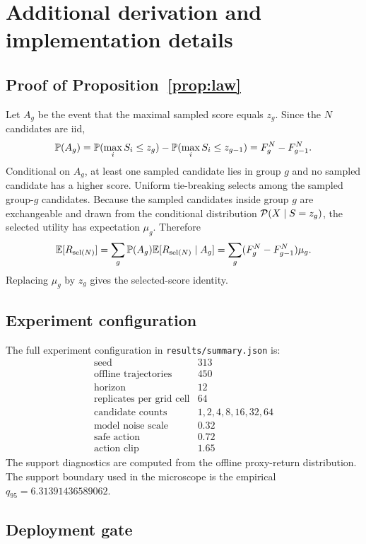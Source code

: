 \section{Additional derivation and implementation details}
\label{app:details}

\subsection{Proof of Proposition~\ref{prop:law}}

Let $A_g$ be the event that the maximal sampled score equals $z_g$. Since the $N$ candidates are iid,
\[
  \mathbb{P}(A_g)=\mathbb{P}(\max_i S_i \leq z_g)-\mathbb{P}(\max_i S_i \leq z_{g-1})
  =F_g^N-F_{g-1}^N.
\]
Conditional on $A_g$, at least one sampled candidate lies in group $g$ and no sampled candidate has a higher score. Uniform tie-breaking selects among the sampled group-$g$ candidates. Because the sampled candidates inside group $g$ are exchangeable and drawn from the conditional distribution $\mathcal{P}(X\mid S=z_g)$, the selected utility has expectation $\mu_g$. Therefore
\[
  \mathbb{E}[R_{\operatorname{sel}(N)}]
  =\sum_g \mathbb{P}(A_g)\mathbb{E}[R_{\operatorname{sel}(N)}\mid A_g]
  =\sum_g (F_g^N-F_{g-1}^N)\mu_g.
\]
Replacing $\mu_g$ by $z_g$ gives the selected-score identity.

\subsection{Experiment configuration}

The full experiment configuration in \texttt{results/summary.json} is:
\[
\begin{array}{ll}
\text{seed} & 313 \\
\text{offline trajectories} & 450 \\
\text{horizon} & 12 \\
\text{replicates per grid cell} & 64 \\
\text{candidate counts} & 1,2,4,8,16,32,64 \\
\text{model noise scale} & 0.32 \\
\text{safe action} & 0.72 \\
\text{action clip} & 1.65
\end{array}
\]
The support diagnostics are computed from the offline proxy-return distribution. The support boundary used in the microscope is the empirical $q_{95}=6.31391436589062$.

\subsection{Deployment gate}

